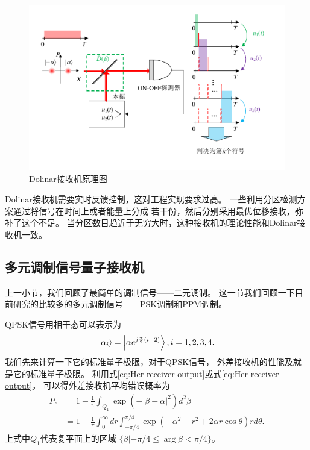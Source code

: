 \begin{figure}
\centering
  \includegraphics[width=\textwidth]{figures/chap2/Dolinar-receiver}
  \caption{Dolinar接收机原理图}
  \label{fig:Dolinar-receiver}
\end{figure}

Dolinar接收机需要实时反馈控制，这对工程实现要求过高。
一些利用分区检测方案通过将信号在时间上或者能量上分成
若干份，然后分别采用最优位移接收，弥补了这个不足\cite{vilnrotter2012quantum,li2013optimal,sych2014optimal}。
当分区数目趋近于无穷大时，这种接收机的理论性能和Dolinar接收机一致\cite{sych2014optimal}。

\subsection{多元调制信号量子接收机}
上一小节，我们回顾了最简单的调制信号——二元调制。
这一节我们回顾一下目前研究的比较多的多元调制信号——PSK调制和PPM调制。

QPSK信号用相干态可以表示为
\begin{equation}
\ket{\alpha_i} = \ket{\alpha e^{j \frac{\pi}{2} (i-2)}},i=1,2,3,4.
\end{equation}
我们先来计算一下它的标准量子极限，对于QPSK信号，
外差接收机的性能及就是它的标准量子极限。
利用式\ref{eq:Her-receiver-output}或式\ref{eq:Her-receiver-output}，
可以得外差接收机平均错误概率为\cite{helstrom1976quantum,kato1999quantum}
\begin{equation}
\begin{split}
P_e &= 1 - \frac{1}{\pi}\int_{Q_1} \exp(-|\beta-\alpha|^2) d^2 \beta \\
    &= 1 - \frac{1}{\pi}\int_0^{\infty} dr \int_{-\pi/4}^{\pi/4} \exp(-\alpha^2 - r^2 + 2\alpha r \cos \theta) r d\theta .
\end{split}
\end{equation}
上式中$Q_1$代表复平面上的区域 $\{\beta|-\pi/4 \le \arg \beta < \pi/4\}$。

